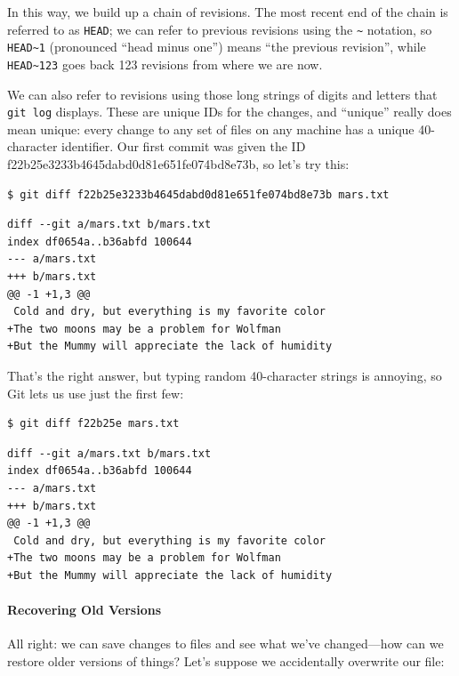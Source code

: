 \documentclass{book}
\begin{document}
In this way, we build up a chain of revisions. The most recent end of
the chain is referred to as \texttt{HEAD}; we can refer to previous
revisions using the \texttt{\textasciitilde{}} notation, so
\texttt{HEAD\textasciitilde{}1} (pronounced ``head minus one'') means
``the previous revision'', while \texttt{HEAD\textasciitilde{}123} goes
back 123 revisions from where we are now.

We can also refer to revisions using those long strings of digits and
letters that \texttt{git log} displays. These are unique IDs for the
changes, and ``unique'' really does mean unique: every change to any set
of files on any machine has a unique 40-character identifier. Our first
commit was given the ID f22b25e3233b4645dabd0d81e651fe074bd8e73b, so
let's try this:

\begin{verbatim}
$ git diff f22b25e3233b4645dabd0d81e651fe074bd8e73b mars.txt
\end{verbatim}

\begin{verbatim}
diff --git a/mars.txt b/mars.txt
index df0654a..b36abfd 100644
--- a/mars.txt
+++ b/mars.txt
@@ -1 +1,3 @@
 Cold and dry, but everything is my favorite color
+The two moons may be a problem for Wolfman
+But the Mummy will appreciate the lack of humidity
\end{verbatim}

That's the right answer, but typing random 40-character strings is
annoying, so Git lets us use just the first few:

\begin{verbatim}
$ git diff f22b25e mars.txt
\end{verbatim}

\begin{verbatim}
diff --git a/mars.txt b/mars.txt
index df0654a..b36abfd 100644
--- a/mars.txt
+++ b/mars.txt
@@ -1 +1,3 @@
 Cold and dry, but everything is my favorite color
+The two moons may be a problem for Wolfman
+But the Mummy will appreciate the lack of humidity
\end{verbatim}

\mbox{}\paragraph{Recovering Old Versions}

All right: we can save changes to files and see what we've changed---how
can we restore older versions of things? Let's suppose we accidentally
overwrite our file:
\end{document}
